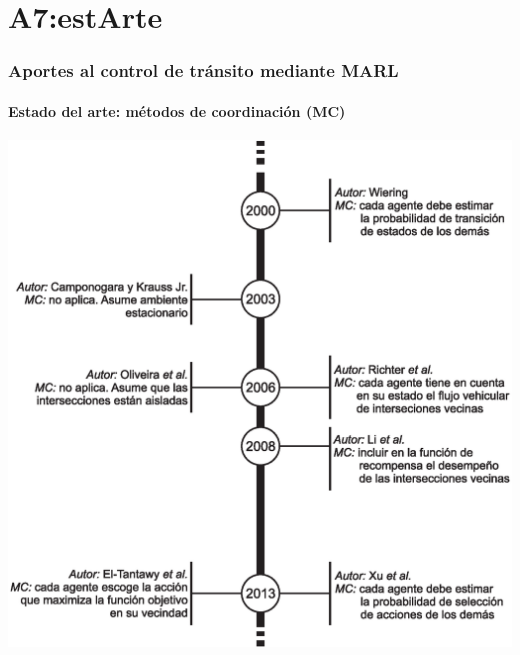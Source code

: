 \documentclass[11pt]{beamer}
\begin{document}
\section{A7:estArte}
\begin{frame}
\frametitle{Aportes al control de tránsito mediante MARL}
\framesubtitle{Estado del arte: métodos de coordinación (MC)}
\begin{center}
\includegraphics[scale=0.4]{./graficas/estArt2.eps}
\end{center}
\end{frame}
\end{document}
